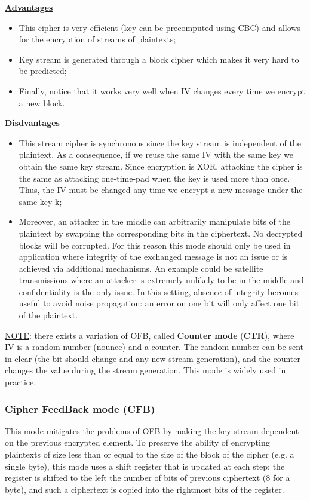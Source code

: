 \underline{\textbf{Advantages}} 

\begin{itemize}
    \item This cipher is very efficient (key can be precomputed using CBC) and allows for the encryption of streams of plaintexts;
    \item Key stream is generated through a block cipher which makes it very hard to be predicted;
    \item Finally, notice that it works very well when IV changes every time we encrypt a new block.
\end{itemize}

\underline{\textbf{Disdvantages}} 

\begin{itemize}
    \item This stream cipher is synchronous since the key stream is independent of the plaintext. As a consequence, if we reuse the same IV with the same key we obtain the same key stream. Since encryption is XOR, attacking the cipher is the same as attacking one-time-pad when the key is used more than once. Thus, the IV must be changed any time we encrypt a new message under the same key k;
    \item Moreover, an attacker in the middle can arbitrarily manipulate bits of the plaintext by swapping the corresponding bits in the ciphertext. No decrypted blocks will be corrupted. For this reason this mode should only be used in application where integrity of the exchanged message is not an issue or is achieved via additional mechanisms. An example could be satellite transmissions where an attacker is extremely unlikely to be in the middle and confidentiality is the only issue. In this setting, absence of integrity becomes useful to avoid noise propagation: an error on one bit will only affect one bit of the plaintext.
\end{itemize}

\underline{NOTE}: there exists a variation of OFB, called \textbf{Counter mode} (\textbf{CTR}), where IV is a random number (nounce) and a counter. The random number can be sent in clear (the bit should change and any new stream generation), and the counter changes the value during the stream generation. This mode is widely used in practice.


\subsubsection{Cipher FeedBack mode (CFB)}
This mode mitigates the problems of OFB by making the key stream dependent on the previous encrypted element. To preserve the ability of encrypting plaintexts of size less than or equal to the size of the block of the cipher (e.g. a single byte), this mode uses a shift register that is updated at each step: the register is shifted to the left the number of bits of previous ciphertext (8 for a byte), and such a ciphertext is copied into the rightmost bits of the register.

